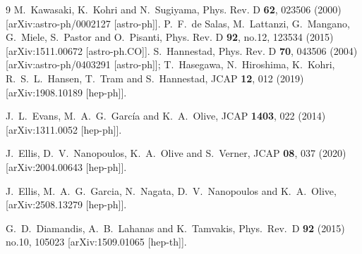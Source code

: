 \documentclass[aps,prev,twocolumn,preprintnumbers,floatfix,nofootinbib]{revtex4-1}
\begin{document}
\begin{thebibliography}{9}
M.~Kawasaki, K.~Kohri and N.~Sugiyama,
Phys. Rev. D \textbf{62}, 023506 (2000)
[arXiv:astro-ph/0002127 [astro-ph]].
P.~F.~de Salas, M.~Lattanzi, G.~Mangano, G.~Miele, S.~Pastor and O.~Pisanti,
Phys. Rev. D \textbf{92}, no.12, 123534 (2015)
[arXiv:1511.00672 [astro-ph.CO]].
S.~Hannestad,
Phys. Rev. D \textbf{70}, 043506 (2004)
[arXiv:astro-ph/0403291 [astro-ph]];
T.~Hasegawa, N.~Hiroshima, K.~Kohri, R.~S.~L.~Hansen, T.~Tram and S.~Hannestad,
JCAP \textbf{12}, 012 (2019)
[arXiv:1908.10189 [hep-ph]].





  J.~L.~Evans, M.~A.~G.~Garc\'ia and K.~A.~Olive,
  JCAP {\bf 1403}, 022 (2014)
  [arXiv:1311.0052 [hep-ph]].
  

J.~Ellis, D.~V.~Nanopoulos, K.~A.~Olive and S.~Verner,
JCAP \textbf{08}, 037 (2020)
[arXiv:2004.00643 [hep-ph]].



J.~Ellis, M.~A.~G.~Garcia, N.~Nagata, D.~V.~Nanopoulos and K.~A.~Olive,
[arXiv:2508.13279 [hep-ph]].

G.~D.~Diamandis, A.~B.~Lahanas and K.~Tamvakis,
  Phys.\ Rev.\ D {\bf 92} (2015) no.10,  105023
  [arXiv:1509.01065 [hep-th]].


\end{thebibliography}
\end{document}

